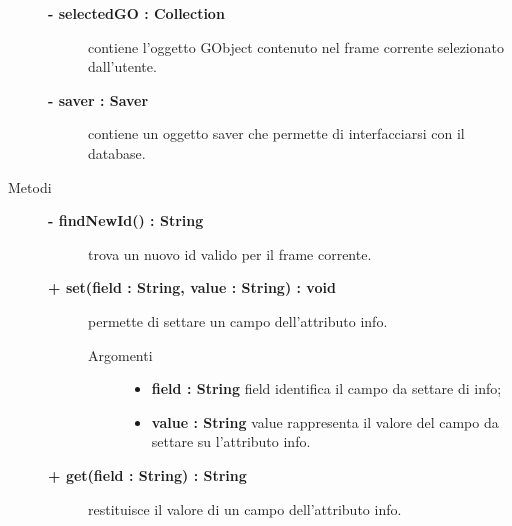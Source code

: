 \begin{description}
\begin{description}
	\end{description}
	\begin{description}
		\item[\textbf{- selectedGO : Collection			}] \hfill
			contiene l'oggetto GObject contenuto nel frame corrente selezionato dall'utente.  
	\end{description}
	\begin{description}
		\item[\textbf{- saver : Saver			}] \hfill
			contiene un oggetto saver che permette di interfacciarsi con il database.  
	\end{description}
	
\item[Metodi] \hfill

	\begin{description}
		\item[\textbf{\color{blue}- findNewId() : String			}] \hfill
			trova un nuovo id valido per il frame corrente.

\end{description}

	\begin{description}
		\item[\textbf{\color{blue}+ set(field : String, value : String) : void			}] \hfill
			permette di settare un campo dell'attributo info.
			
		\begin{description}
			\item[Argomenti] \hfill
				\begin{itemize}
				
					\item \textbf{field : String			} \hfill
					field identifica il campo da settare di info;
					\item \textbf{value : String			} \hfill
					value rappresenta il valore del campo da settare su l'attributo info.
				\end{itemize}
		\end{description}

\end{description}

\begin{description}
		\item[\textbf{\color{blue}+ get(field : String) : String			}] \hfill
			restituisce il valore di un campo dell'attributo info.
			

\end{description}
\end{description}

